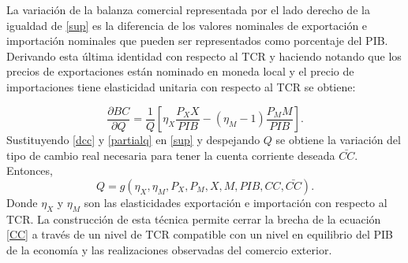 \documentclass[12pt,letterpaper]{article}
\begin{document}
La variación de la balanza comercial representada por el lado derecho de la igualdad de \ref{sup} es la diferencia de los valores nominales de exportación e importación nominales que pueden ser representados como porcentaje del PIB. Derivando esta última identidad con respecto al TCR y haciendo notando que los precios de exportaciones están nominado en moneda local y el precio de importaciones tiene elasticidad unitaria con respecto al TCR se obtiene:

\begin{equation}\label{partialq}
\frac{\partial BC}{\partial Q}=\frac{1}{Q} \left[\eta_X \frac{P_X X}{PIB}-(\eta_M -1)\frac{P_M M}{PIB}\right].
\end{equation}
Sustituyendo \ref{dcc} y \ref{partialq} en \ref{sup} y despejando $Q$ se obtiene la variación del tipo de cambio real necesaria para tener la cuenta corriente deseada $\bar{CC}$. Entonces,
\begin{equation}\label{qfeer}
Q=g\left(\eta_X,\eta_M,P_X,P_M,X,M,PIB,CC,\bar{CC}\right).
\end{equation}
Donde $\eta_X$ y $\eta_M$ son las elasticidades exportación e importación con respecto al TCR. La construcción de esta técnica permite cerrar la brecha de la ecuación \ref{CC} a través de un nivel de TCR compatible con un nivel en equilibrio del PIB de la economía y las realizaciones observadas del comercio exterior.
\end{document}
